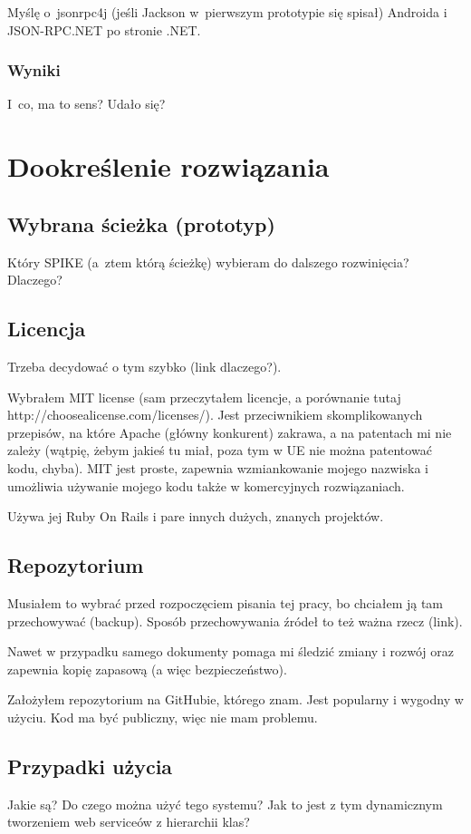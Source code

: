 Myślę o~jsonrpc4j (jeśli Jackson w~pierwszym prototypie się spisał) Androida i JSON-RPC.NET po stronie .NET\@.

\subsubsection{Wyniki}
I~co, ma to sens? Udało się?



\section{Dookreślenie rozwiązania}
\subsection{Wybrana ścieżka (prototyp)}
Który SPIKE (a~ztem którą ścieżkę) wybieram do dalszego rozwinięcia?
Dlaczego?

\subsection{Licencja}
Trzeba decydować o tym szybko (link dlaczego?).

Wybrałem MIT license (sam przeczytałem licencje, a porównanie tutaj http://choosealicense.com/licenses/). Jest przeciwnikiem skomplikowanych przepisów, na które Apache (główny konkurent) zakrawa, a na patentach mi nie zależy (wątpię, żebym jakieś tu miał, poza tym w UE nie można patentować kodu, chyba). MIT jest proste, zapewnia wzmiankowanie mojego nazwiska i umożliwia używanie mojego kodu także w komercyjnych rozwiązaniach.

Używa jej Ruby On Rails i pare innych dużych, znanych projektów.

\subsection{Repozytorium}
Musiałem to wybrać przed rozpoczęciem pisania tej pracy, bo chciałem ją tam przechowywać (backup). Sposób przechowywania źródeł to też ważna rzecz (link).

Nawet w przypadku samego dokumenty pomaga mi śledzić zmiany i rozwój oraz zapewnia kopię zapasową (a więc bezpieczeństwo).

Założyłem repozytorium na GitHubie, którego znam. Jest popularny i wygodny w użyciu. Kod ma być publiczny, więc nie mam problemu. 




\subsection{Przypadki użycia}
Jakie są? Do czego można użyć tego systemu? Jak to jest z tym dynamicznym tworzeniem web serviceów z hierarchii klas?



